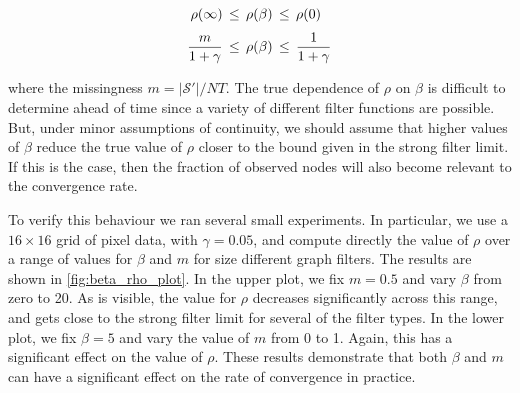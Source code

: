 \begin{align}
    \label{eq:rho_bounds}
\rho(\infty) \, & \leq \, \rho(\beta) \, \leq \, \rho(0)  \notag \\[0.1cm]
 \frac{m}{1 + \gamma} \, &\leq \, \rho (\beta) \, \leq \, \frac{1}{1 + \gamma}
\end{align}

where the missingness $m = |\mathcal{S}'|/ NT$. The true dependence of $\rho$ on $\beta$ is difficult to determine ahead of time since a variety of different filter functions are possible. But, under minor assumptions of continuity, we should assume that higher values of $\beta$ reduce the true value of $\rho$ closer to the bound given in the strong filter limit. If this is the case, then the fraction of observed nodes will also become relevant to the convergence rate. 

To verify this behaviour we ran several small experiments. In particular, we use a $16 \times 16$ grid of pixel data, with $\gamma = 0.05$, and compute directly the value of $\rho$ over a range of values for $\beta$ and $m$ for size different graph filters. The results are shown in \cref{fig:beta_rho_plot}. In the upper plot, we fix $m = 0.5$ and vary $\beta$ from zero to 20. As is visible, the value for $\rho$ decreases significantly across this range, and gets close to the strong filter limit for several of the filter types. In the lower plot, we fix $\beta=5$ and vary the value of $m$ from 0 to 1. Again, this has a significant effect on the value of $\rho$. These results demonstrate that both $\beta$ and $m$ can have a significant effect on the rate of convergence in practice. 

